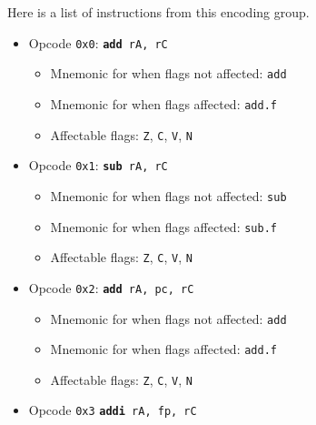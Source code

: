 \documentclass{article}
\begin{document}
	Here is a list of instructions from this encoding group.

	\singlespacing
	\begin{itemize}
		\item Opcode \texttt{0x0}:
			\texttt{\textbf{add} rA, rC}
		\begin{itemize}
			\item Mnemonic for when flags not affected:  \texttt{add}
			\item Mnemonic for when flags affected:  \texttt{add.f}
			\item Affectable flags:
				\texttt{Z}, \texttt{C}, \texttt{V}, \texttt{N}
		\end{itemize}
		\item Opcode \texttt{0x1}:
			\texttt{\textbf{sub} rA, rC}
		\begin{itemize}
			\item Mnemonic for when flags not affected:  \texttt{sub}
			\item Mnemonic for when flags affected:  \texttt{sub.f}
			\item Affectable flags:
				\texttt{Z}, \texttt{C}, \texttt{V}, \texttt{N}
		\end{itemize}
		\item Opcode \texttt{0x2}:
			\texttt{\textbf{add} rA, pc, rC}
		\begin{itemize}
			\item Mnemonic for when flags not affected:  \texttt{add}
			\item Mnemonic for when flags affected:  \texttt{add.f}
			\item Affectable flags:
				\texttt{Z}, \texttt{C}, \texttt{V}, \texttt{N}
		\end{itemize}
		\item Opcode \texttt{0x3}
			\texttt{\textbf{addi} rA, fp, rC}
		\begin{itemize}

\end{itemize}
\end{itemize}
\end{document}
